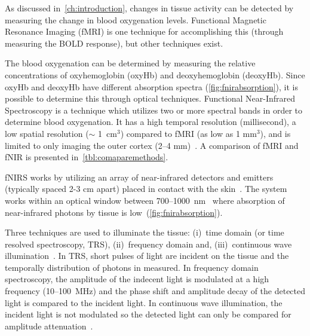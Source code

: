 As discussed in~\cref{ch:introduction}, changes in tissue activity can be detected by measuring the change in blood oxygenation levels.  Functional Magnetic Resonance Imaging (fMRI) is one technique for accomplishing this (through measuring the BOLD response), but other techniques exist.  

The blood oxygenation can be determined by measuring the relative concentrations of oxyhemoglobin (oxyHb) and deoxyhemoglobin (deoxyHb).  Since oxyHb and deoxyHb have different absorption spectra (\cref{fig:fnirabsorption}), it is possible to determine this through optical techniques.  Functional Near-Infrared Spectroscopy is a technique which utilizes two or more spectral bands in order to determine blood oxygenation.  It has a high temporal resolution (millisecond), a low spatial resolution ($\sim$ 1~cm$^3$) compared to fMRI (as low as 1 mm$^3$), and is limited to only imaging the outer cortex (2--4 mm)~\citep{bunce2006}. A comparison of fMRI and fNIR is presented in~\cref{tbl:comaparemethods}.

fNIRS works by utilizing an array of near-infrared detectors and emitters (typically spaced 2-3 cm apart) placed in contact with the skin~\citep{villringer1997,izzetoglu2004}.  The system works within an optical window between 700--1000~nm~\citep{villringer1997} where absorption of near-infrared photons by tissue is low~(\cref{fig:fnirabsorption}).

Three techniques are used to illuminate the tissue: (i)~time domain (or time resolved spectroscopy, TRS), (ii)~frequency domain and, (iii)~continuous wave illumination~\citep{izzetoglu2004}.  In TRS, short pulses of light are incident on the tissue and the temporally distribution of photons in measured.  In frequency domain spectroscopy, the amplitude of the indecent light is modulated at a high frequency (10--100~MHz) and the phase shift and amplitude decay of the detected light is compared to the incident light. In continuous wave illumination, the incident light is not modulated so the detected light can only be compared for amplitude attenuation~\citep{izzetoglu2004}.

